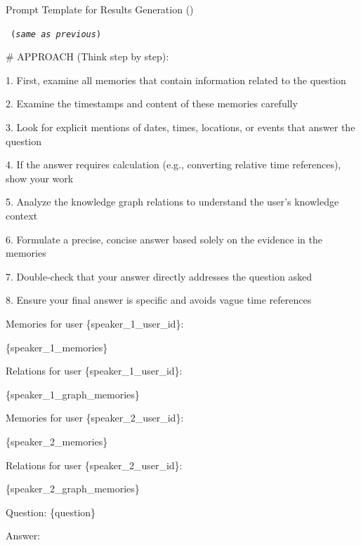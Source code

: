\begin{EqBox}[!htbp]{Prompt Template for Results Generation (\memp)}
\vspace{1mm}
{\tt \footnotesize  
(\textit{same as previous})
\vspace{0.5cm}

\# APPROACH (Think step by step):\vspace{0.5cm}

1. First, examine all memories that contain information related to the question

2. Examine the timestamps and content of these memories carefully

3. Look for explicit mentions of dates, times, locations, or events that answer the 
   question
   
4. If the answer requires calculation (e.g., converting relative time references), 
   show your work
   
5. Analyze the knowledge graph relations to understand the user's knowledge context

6. Formulate a precise, concise answer based solely on the evidence in the memories

7. Double-check that your answer directly addresses the question asked

8. Ensure your final answer is specific and avoids vague time references

\vspace{0.5cm}
Memories for user \{speaker\_1\_user\_id\}:

\{speaker\_1\_memories\}
\vspace{0.5cm}

Relations for user \{speaker\_1\_user\_id\}:

\{speaker\_1\_graph\_memories\}
\vspace{0.5cm}

Memories for user \{speaker\_2\_user\_id\}:

\{speaker\_2\_memories\}
\vspace{0.5cm}

Relations for user \{speaker\_2\_user\_id\}:

\{speaker\_2\_graph\_memories\}
\vspace{0.5cm}

Question: \{question\}
\vspace{0.5cm}

Answer:
}
\end{EqBox}


